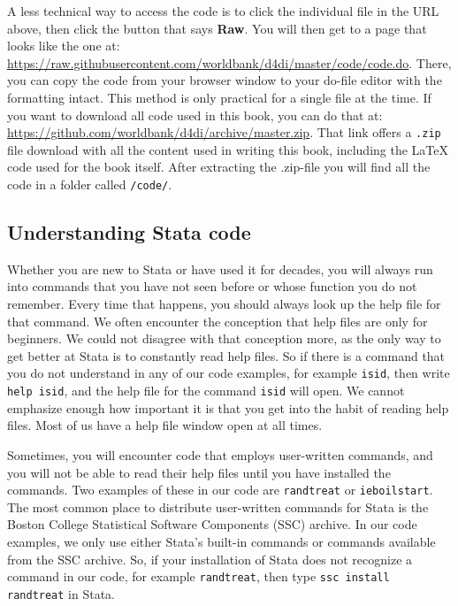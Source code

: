 A less technical way to access the code is to click the individual file in the URL above, then click
the button that says \textbf{Raw}. You will then get to a page that looks like the one at:
\url{https://raw.githubusercontent.com/worldbank/d4di/master/code/code.do}.
There, you can copy the code from your browser window to your do-file editor with the formatting intact.
This method is only practical for a single file at the time.
If you want to download all code used in this book, you can do that at:
\url{https://github.com/worldbank/d4di/archive/master.zip}. That link offers a \texttt{.zip} file download
with all the content used in writing this book, including the \LaTeX{} code used for the book itself. After
extracting the .zip-file you will find all the code in a folder called \texttt{/code/}.

\subsection{Understanding Stata code}

Whether you are new to Stata or have used it for decades,
you will always run into commands that
you have not seen before or whose function you do not remember.
Every time that happens,
you should always look up the help file for that command.
We often encounter the conception that help files are only for beginners.
We could not disagree with that conception more,
as the only way to get better at Stata is to constantly read help files.
So if there is a command that you do not understand in any of our code examples,
for example \texttt{isid}, then write \texttt{help isid},
and the help file for the command \texttt{isid} will open.
We cannot emphasize enough how important it is
that you get into the habit of reading help files.
Most of us have a help file window open at all times.

Sometimes, you will encounter code that employs user-written commands,
and you will not be able to read their help files until you have installed the commands.
Two examples of these in our code are \texttt{randtreat} or \texttt{ieboilstart}.
The most common place to distribute user-written commands for Stata
is the Boston College Statistical Software Components (SSC) archive.
In our code examples, we only use either Stata's built-in commands or commands available from the
SSC archive.
So, if your installation of Stata does not recognize a command in our code, for example
\texttt{randtreat}, then type \texttt{ssc install randtreat} in Stata.

